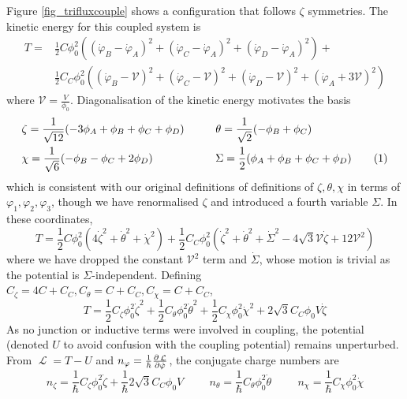 \documentclass[11pt]{article}
\newcommand\numberthis{\addtocounter{equation}{1}\tag{\theequation}}
\DeclareMathOperator{\lagr}{\mathcal{L}}
\begin{document}
Figure \ref{fig_trifluxcouple} shows a configuration that follows $\zeta$ symmetries. The kinetic energy for this coupled system is
\begin{align}
T
=& \frac{1}{2} C \phi_0^2 \left((\dot{\varphi}_B - \dot{\varphi}_A)^2 + (\dot{\varphi}_C - \dot{\varphi}_A)^2 + (\dot{\varphi}_D - \dot{\varphi}_A)^2\right) + \nonumber \\
&\frac{1}{2} C_C \phi_0^2 \left((\dot{\varphi}_B - \mathcal{V})^2 + (\dot{\varphi}_C - \mathcal{V})^2 + (\dot{\varphi}_D - \mathcal{V})^2 + (\dot{\varphi}_A + 3 \mathcal{V})^2 \right) 
\end{align}
where $\mathcal{V} = \frac{V}{\phi_0}$. Diagonalisation of the kinetic energy motivates the basis
\begin{align*}
&\zeta = \frac{1}{\sqrt{12}} (-3\phi_A + \phi_B + \phi_C + \phi_D) \hspace{1cm}
\theta = \frac{1}{\sqrt{2}} (-\phi_B + \phi_C) \\
&\chi = \frac{1}{\sqrt{6}}  (-\phi_B - \phi_C + 2 \phi_D) \hspace{2cm}
\Sigma = \frac{1}{2} (\phi_A + \phi_B + \phi_C + \phi_D) \numberthis
\end{align*}
which is consistent with our original definitions of definitions of $\zeta, \theta, \chi$ in terms of $\varphi_1, \varphi_2, \varphi_3$, though we have renormalised $\zeta$ and introduced a fourth variable $\Sigma$. In these coordinates,
\begin{equation}
T = \frac{1}{2} C \phi_0^2 (4 \dot{\zeta}^2 + \dot{\theta}^2 + \dot{\chi}^2) + 
\frac{1}{2} C_C \phi_0^2 (\dot{\zeta}^2 + \dot{\theta}^2 + \dot{\Sigma}^2 - 4 \sqrt{3} \mathcal{V} \dot{\zeta} + 12 \mathcal{V}^2)
\end{equation}
where we have dropped the constant $\mathcal{V}^2$ term and $\dot{\Sigma}$, whose motion is trivial as the potential is $\Sigma$-independent. Defining $C_\zeta = 4C + C_C, C_\theta = C + C_C, C_\chi = C + C_C$, 
\begin{equation}
T = \frac{1}{2} C_\zeta \phi_0^2 \dot{\zeta}^2 + \frac{1}{2} C_\theta \phi_0^2 \dot{\theta}^2 + \frac{1}{2} C_\chi \phi_0^2 \dot{\chi}^2 + 2 \sqrt{3} C_C \phi_0 V \dot{\zeta}
\end{equation}
As no junction or inductive terms were involved in coupling, the potential (denoted $U$ to avoid confusion with the coupling potential) remains unperturbed. From $\lagr=T-U$ and $n_\varphi = \frac{1}{\hbar} \pdv{\lagr}{\dot{\varphi}}$, the conjugate charge numbers are
\begin{equation}
n_\zeta = \frac{1}{\hbar} C_\zeta \phi_0^2 \dot{\zeta} + \frac{1}{\hbar} 2 \sqrt{3} C_C \phi_0 V
\hspace{1cm}
n_\theta = \frac{1}{\hbar} C_\theta \phi_0^2 \dot{\theta}
\hspace{1cm}
n_\chi = \frac{1}{\hbar} C_\chi \phi_0^2 \dot{\chi} 
\end{equation}
\end{document}
